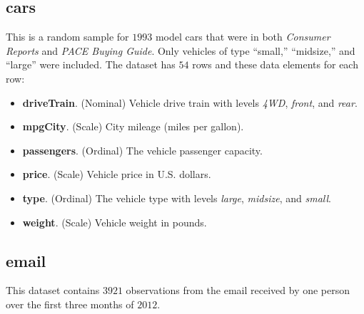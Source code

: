 \subsection{cars}
This is a random sample for $ 1993 $ model cars that were in both \textit{Consumer Reports} and \textit{PACE Buying Guide}. Only vehicles of type ``small,'' ``midsize,'' and ``large'' were included. The dataset has $ 54 $ rows and these data elements for each row:

\begin{itemize}
  \item \textbf{driveTrain}. (Nominal) Vehicle drive train with levels \textit{4WD}, \textit{front}, and \textit{rear}.
  \item \textbf{mpgCity}. (Scale) City mileage (miles per gallon).
  \item \textbf{passengers}. (Ordinal) The vehicle passenger capacity. 
  \item \textbf{price}. (Scale) Vehicle price in U.S. dollars.
  \item \textbf{type}. (Ordinal) The vehicle type with levels \textit{large}, \textit{midsize}, and \textit{small}.
  \item \textbf{weight}. (Scale) Vehicle weight in pounds.
\end{itemize}

\subsection{email}

This dataset contains $ 3921 $ observations from the email received by one person over the first three months of $ 2012 $.

